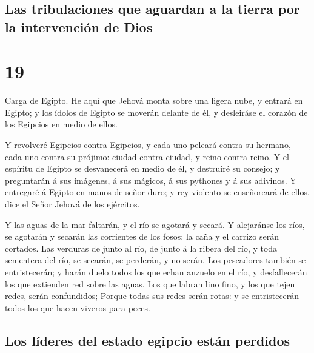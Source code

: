 \hypertarget{las-tribulaciones-que-aguardan-a-la-tierra-por-la-intervenciuxf3n-de-dios}{%
\subsection{Las tribulaciones que aguardan a la tierra por la
intervención de
Dios}\label{las-tribulaciones-que-aguardan-a-la-tierra-por-la-intervenciuxf3n-de-dios}}

\hypertarget{section-18}{%
\section{19}\label{section-18}}

 Carga de Egipto. He aquí que Jehová monta sobre una
ligera nube, y entrará en Egipto; y los ídolos de Egipto se moverán
delante de él, y desleiráse el corazón de los Egipcios en medio de
ellos.

 Y revolveré Egipcios contra Egipcios, y cada uno peleará
contra su hermano, cada uno contra su prójimo: ciudad contra ciudad, y
reino contra reino.  Y el espíritu de Egipto se
desvanecerá en medio de él, y destruiré su consejo; y preguntarán á sus
imágenes, á sus mágicos, á sus pythones y á sus adivinos. 
Y entregaré á Egipto en manos de señor duro; y rey violento se
enseñoreará de ellos, dice el Señor Jehová de los ejércitos.

 Y las aguas de la mar faltarán, y el río se agotará y
secará.  Y alejaránse los ríos, se agotarán y secarán las
corrientes de los fosos: la caña y el carrizo serán cortados.
 Las verduras de junto al río, de junto á la ribera del
río, y toda sementera del río, se secarán, se perderán, y no serán.
 Los pescadores también se entristecerán; y harán duelo
todos los que echan anzuelo en el río, y desfallecerán los que extienden
red sobre las aguas.  Los que labran lino fino, y los que
tejen redes, serán confundidos;  Porque todas sus redes
serán rotas: y se entristecerán todos los que hacen viveros para peces.

\hypertarget{los-luxedderes-del-estado-egipcio-estuxe1n-perdidos}{%
\subsection{Los líderes del estado egipcio están
perdidos}\label{los-luxedderes-del-estado-egipcio-estuxe1n-perdidos}}

